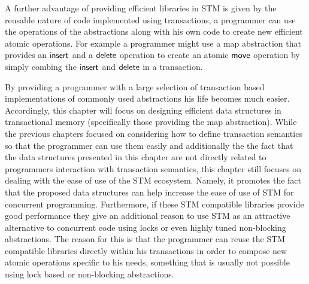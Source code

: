 A further advantage of providing efficient libraries in STM is given by the reusable nature of code implemented using
transactions, a programmer can use the operations of the abstractions along with his own code
to create new efficient atomic operations.
For example a programmer might use a map abstraction that provides an $\lit{insert}$ and a $\lit{delete}$ operation
to create an atomic $\lit{move}$ operation by simply combing the $\lit{insert}$ and $\lit{delete}$ in a transaction.

By providing a programmer with a large selection of transaction based implementations of commonly used abstractions
his life becomes much easier.
Accordingly, this chapter will focus on designing efficient data structures in transactional memory (specifically those providing the map abstraction).
While the previous chapters focused on considering how to define transaction semantics so that the programmer can use them easily and additionally
the the fact that the data structures presented in this chapter are not directly related to programmers interaction with transaction semantics,
this chapter still focuses on dealing with the ease of use of the STM ecosystem.
Namely, it promotes the fact that the proposed data structures can help increase the ease of use of STM for concurrent programming.
Furthermore, if these STM compatible libraries provide good performance they give an additional reason to use STM as an attractive alternative to
concurrent code using locks or even highly tuned non-blocking abstractions.
The reason for this is that the programmer can reuse
the STM compatible libraries directly within his transactions in order to compose new atomic operations specific to his needs,
something that is usually not possible using lock based or non-blocking abstractions.


